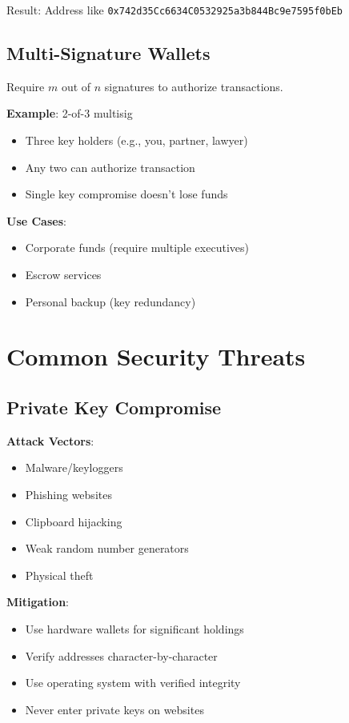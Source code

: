 \documentclass[11pt,a4paper]{article}
\begin{document}
Result: Address like \texttt{0x742d35Cc6634C0532925a3b844Bc9e7595f0bEb}

\subsection{Multi-Signature Wallets}

Require $m$ out of $n$ signatures to authorize transactions.

\textbf{Example}: 2-of-3 multisig
\begin{itemize}
  \item Three key holders (e.g., you, partner, lawyer)
  \item Any two can authorize transaction
  \item Single key compromise doesn't lose funds
\end{itemize}

\textbf{Use Cases}:
\begin{itemize}
  \item Corporate funds (require multiple executives)
  \item Escrow services
  \item Personal backup (key redundancy)
\end{itemize}

\section{Common Security Threats}

\subsection{Private Key Compromise}

\textbf{Attack Vectors}:
\begin{itemize}
  \item Malware/keyloggers
  \item Phishing websites
  \item Clipboard hijacking
  \item Weak random number generators
  \item Physical theft
\end{itemize}

\textbf{Mitigation}:
\begin{itemize}
  \item Use hardware wallets for significant holdings
  \item Verify addresses character-by-character
  \item Use operating system with verified integrity
  \item Never enter private keys on websites
\end{itemize}
\end{document}
